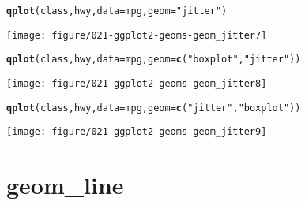\documentclass[a4paper,titlepage]{tufte-handout}\usepackage{graphicx, color}
\makeatletter
\def\maxwidth{ %
  \ifdim\Gin@nat@width>\linewidth
    \linewidth
  \else
    \Gin@nat@width
  \fi
}
\newcommand{\hlfunctioncall}[1]{\textcolor[rgb]{0.501960784313725,0,0.329411764705882}{\textbf{#1}}}%
\newcommand{\hlstring}[1]{\textcolor[rgb]{0.6,0.6,1}{#1}}%
\newenvironment{kframe}{%
 \def\at@end@of@kframe{}%
 \ifinner\ifhmode%
  \def\at@end@of@kframe{\end{minipage}}%
  \begin{minipage}{\columnwidth}%
 \fi\fi%
 \def\FrameCommand##1{\hskip\@totalleftmargin \hskip-\fboxsep
 \colorbox{shadecolor}{##1}\hskip-\fboxsep
     \hskip-\linewidth \hskip-\@totalleftmargin \hskip\columnwidth}%
 \MakeFramed {\advance\hsize-\width
   \@totalleftmargin\z@ \linewidth\hsize
   \@setminipage}}%
 {\par\unskip\endMakeFramed%
 \at@end@of@kframe}
\newenvironment{knitrout}{}{} %
\makeatother
\begin{document}
\begin{knitrout}
\begin{kframe}
\begin{alltt}
\hlfunctioncall{qplot}(class, hwy, data = mpg, geom = \hlstring{"jitter"})
\end{alltt}
\end{kframe}\texttt{[image: figure/021-ggplot2-geoms-geom\_jitter7]} \begin{kframe}\begin{alltt}
\hlfunctioncall{qplot}(class, hwy, data = mpg, geom = \hlfunctioncall{c}(\hlstring{"boxplot"}, \hlstring{"jitter"}))
\end{alltt}
\end{kframe}\texttt{[image: figure/021-ggplot2-geoms-geom\_jitter8]} \begin{kframe}\begin{alltt}
\hlfunctioncall{qplot}(class, hwy, data = mpg, geom = \hlfunctioncall{c}(\hlstring{"jitter"}, \hlstring{"boxplot"}))
\end{alltt}
\end{kframe}\texttt{[image: figure/021-ggplot2-geoms-geom\_jitter9]} 
\end{knitrout}


\section{geom\_line}
\end{document}
